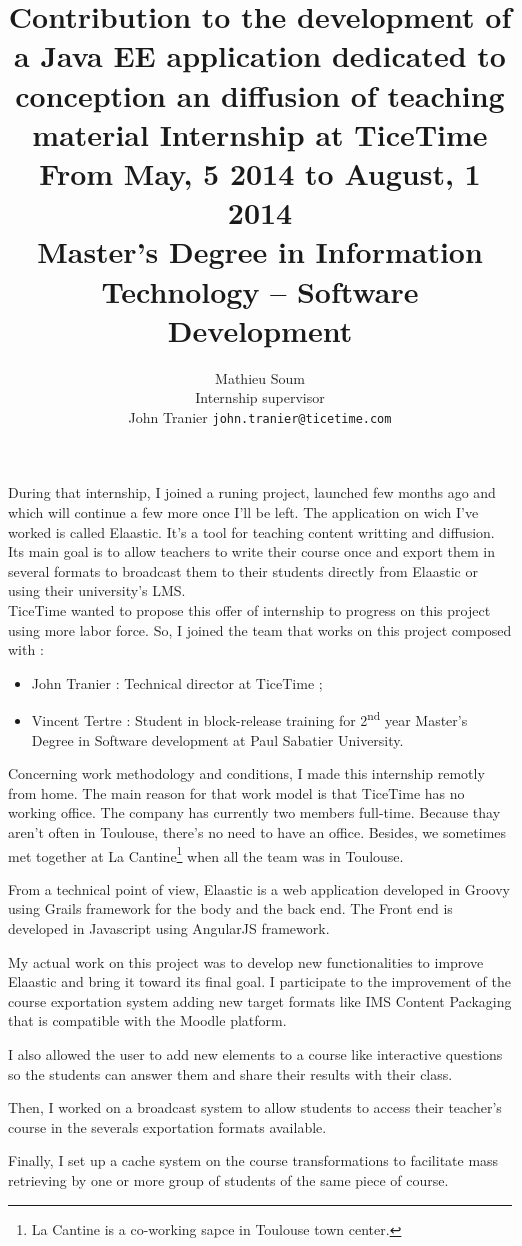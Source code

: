 \documentclass[a4paper, 11pt]{article}
\title{
  Contribution to the development of a Java EE application dedicated to
  conception an diffusion of teaching material
  \vspace{10px}
  {
	\large Internship at TiceTime\\
	From May, 5\ts{th} 2014 to August, 1\ts{st} 2014\\
	Master's Degree in Information Technology -- Software Development
  }
}
\author{
  Mathieu {\sc Soum}
  \vspace{10px}\\
  Internship supervisor\\
	John {\sc Tranier} {\tt john.tranier@ticetime.com}
}
\date{}
\newcommand{\ts}{\textsuperscript}
\begin{document}
\maketitle

During that internship, I joined a runing project, launched few months ago and
which will continue a few more once I'll be left. The application on wich I've
worked is called Elaastic. It's a tool for teaching content writting and
diffusion. Its main goal is to allow teachers to write their course once and
export them in several formats to broadcast them to their students directly from
Elaastic or using their university's LMS.\\

TiceTime wanted to propose this offer of internship to progress on this project
using more labor force. So, I joined the team that works on this project
composed with :
\begin{itemize}
  \item John {\sc Tranier} : Technical director at TiceTime ;
  \item Vincent {\sc Tertre} : Student in block-release training for 2\ts{nd}
	year Master's Degree in Software development at Paul Sabatier University.
\end{itemize}
\vspace{10px}

Concerning work methodology and conditions, I made this internship remotly from
home. The main reason for that work model is that TiceTime has no working
office. The company has currently two members full-time. Because thay aren't
often in Toulouse, there's no need to have an office. Besides, we sometimes met
together at La Cantine\footnote{La Cantine is a co-working sapce in
Toulouse town center.} when all the team was in Toulouse.

From a technical point of view, Elaastic is a web application developed in
Groovy using Grails framework for the body and the back end. The Front end is developed
in Javascript using AngularJS framework.

My actual work on this project was to develop new functionalities to improve
Elaastic and bring it toward its final goal. I participate to the improvement of
the course exportation system adding new target formats like IMS Content
Packaging that is compatible with the Moodle platform.

I also allowed the user
to add new elements to a course like interactive questions so the students can
answer them and share their results with their class.

Then, I worked on a
broadcast system to allow students to access their teacher's course in the
severals exportation formats available.

Finally, I set up a cache system on the
course transformations to facilitate mass retrieving by one or more group of
students of the same piece of course.
\end{document}
